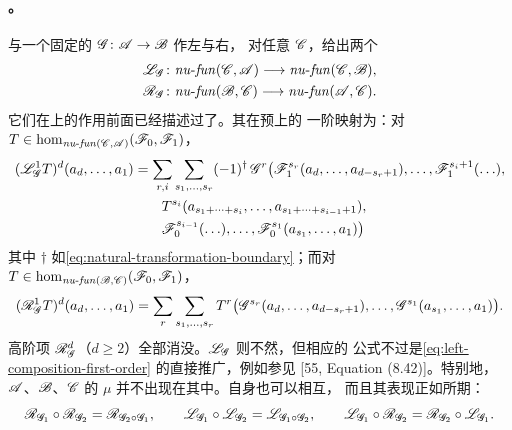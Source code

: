 \paragraph{\trComposition\trFunctor。}\label{sub:composition-functors}
与一个固定的 $\mathscr{G}\colon\mathscr{A}\to\mathscr{B}$ 作左\trComposition{}与右\trComposition{}，
对任意\trNonunital{} \trACategory{} $\mathscr{C}$，给出两个\trNonunital{} \trAFunctor
\begin{equation*}
\begin{aligned}
\mathscr{L}_{\mathscr{G}}&\colon\mathit{nu}\text{-}\mathit{fun}(\mathscr{C},\mathscr{A})
  \longrightarrow\mathit{nu}\text{-}\mathit{fun}(\mathscr{C},\mathscr{B}),\\
\mathscr{R}_{\mathscr{G}}&\colon\mathit{nu}\text{-}\mathit{fun}(\mathscr{B},\mathscr{C})
  \longrightarrow\mathit{nu}\text{-}\mathit{fun}(\mathscr{A},\mathscr{C}).
\end{aligned}
\end{equation*}
它们在\trObject{}上的作用前面已经描述过了。其在预\trNaturalTransformation{}上的
一阶映射为：对
$T\in\hom_{\mathit{nu}\text{-}\mathit{fun}(\mathscr{C},\mathscr{A})}(\mathscr{F}_0,\mathscr{F}_1)$，
\begin{equation}\label{eq:left-composition-first-order}
\begin{split}
(\mathscr{L}^1_{\mathscr{G}}T)^d(a_d,\ldots,a_1)
&=\sum_{r,i}\sum_{s_1,\ldots,s_r}(-1)^{\dagger}\,\mathscr{G}^r\bigl(
  \mathscr{F}_1^{s_r}(a_d,\ldots,a_{d-s_r+1}),\ldots,\mathscr{F}_1^{s_i+1}(\ldots),\\
&\qquad T^{s_i}(a_{s_1+\cdots+s_i},\ldots,a_{s_1+\cdots+s_{i-1}+1}),\\
&\qquad \mathscr{F}_0^{s_{i-1}}(\ldots),\ldots,\mathscr{F}_0^{s_1}(a_{s_1},\ldots,a_1)\bigr)
\end{split}
\end{equation}
其中 $\dagger$ 如\eqref{eq:natural-transformation-boundary}；而对
$T\in\hom_{\mathit{nu}\text{-}\mathit{fun}(\mathscr{B},\mathscr{C})}(\mathscr{F}_0,\mathscr{F}_1)$，
\begin{equation*}
(\mathscr{R}^1_{\mathscr{G}}T)^d(a_d,\ldots,a_1)
=\sum_{r}\sum_{s_1,\ldots,s_r}T^r\bigl(\mathscr{G}^{s_r}(a_d,\ldots,a_{d-s_r+1}),\ldots,
  \mathscr{G}^{s_1}(a_{s_1},\ldots,a_1)\bigr).
\end{equation*}
高阶项 $\mathscr{R}^d_{\mathscr{G}}$（$d\ge 2$）全部消没。$\mathscr{L}_{\mathscr{G}}$ 则不然，但相应的
公式不过是\eqref{eq:left-composition-first-order} 的直接推广，例如参见
[55, Equation (8.42)]。特别地，\trACategory{} $\mathscr{A}$、$\mathscr{B}$、$\mathscr{C}$ 的%
\trStructureMap{} $\mu$ 并不出现在其中。\trComposition\trFunctor{}自身也可以相互\trComposition{}，
而且其表现正如所期：
\begin{equation}\label{eq:composition-functor-relations}
\mathscr{R}_{\mathscr{G}_1}\circ\mathscr{R}_{\mathscr{G}_2}=\mathscr{R}_{\mathscr{G}_2\circ\mathscr{G}_1},
\qquad
\mathscr{L}_{\mathscr{G}_1}\circ\mathscr{L}_{\mathscr{G}_2}=\mathscr{L}_{\mathscr{G}_1\circ\mathscr{G}_2},
\qquad
\mathscr{L}_{\mathscr{G}_1}\circ\mathscr{R}_{\mathscr{G}_2}=\mathscr{R}_{\mathscr{G}_2}\circ\mathscr{L}_{\mathscr{G}_1}.
\end{equation}
